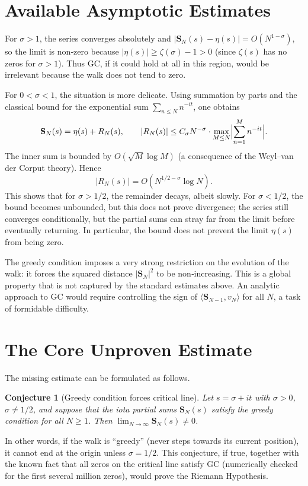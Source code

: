 \documentclass[11pt,a4paper]{article}
\newtheorem{conjecture}[theorem]{Conjecture}
\begin{document}
\section{Available Asymptotic Estimates}
For $\sigma>1$, the series converges absolutely and $|\mathbf{S}_N(s)-\eta(s)|=O(N^{1-\sigma})$, so the limit is non‑zero because $|\eta(s)|\ge \zeta(\sigma)-1>0$ (since $\zeta(s)$ has no zeros for $\sigma>1$).  Thus GC, if it could hold at all in this region, would be irrelevant because the walk does not tend to zero.

For $0<\sigma<1$, the situation is more delicate.  Using summation by parts and the classical bound for the exponential sum $\sum_{n\le N} n^{-it}$, one obtains
\[
\mathbf{S}_N(s) = \eta(s) + R_N(s),\qquad
|R_N(s)| \le C_\sigma N^{-\sigma} \cdot \max_{M\le N} \Bigl|\sum_{n=1}^{M} n^{-it}\Bigr|.
\]
The inner sum is bounded by $O(\sqrt{M}\log M)$ (a consequence of the Weyl–van der Corput theory).  Hence
\[
|R_N(s)| = O(N^{1/2-\sigma}\log N).
\]
This shows that for $\sigma>1/2$, the remainder decays, albeit slowly.  For $\sigma<1/2$, the bound becomes unbounded, but this does not prove divergence; the series still converges conditionally, but the partial sums can stray far from the limit before eventually returning.  In particular, the bound does not prevent the limit $\eta(s)$ from being zero.

The greedy condition imposes a very strong restriction on the evolution of the walk: it forces the squared distance $|\mathbf{S}_N|^2$ to be non‑increasing.  This is a global property that is not captured by the standard estimates above.  An analytic approach to GC would require controlling the sign of $\langle\mathbf{S}_{N-1},v_N\rangle$ for all $N$, a task of formidable difficulty.

\section{The Core Unproven Estimate}
The missing estimate can be formulated as follows.

\begin{conjecture}[Greedy condition forces critical line]\label{conj:main}
Let $s=\sigma+it$ with $\sigma>0$, $\sigma\neq 1/2$, and suppose that the iota partial sums $\mathbf{S}_N(s)$ satisfy the greedy condition for all $N\ge 1$.  Then $\lim_{N\to\infty}\mathbf{S}_N(s)\neq 0$.
\end{conjecture}

In other words, if the walk is ``greedy'' (never steps towards its current position), it cannot end at the origin unless $\sigma=1/2$.  This conjecture, if true, together with the known fact that all zeros on the critical line satisfy GC (numerically checked for the first several million zeros), would prove the Riemann Hypothesis.
\end{document}

